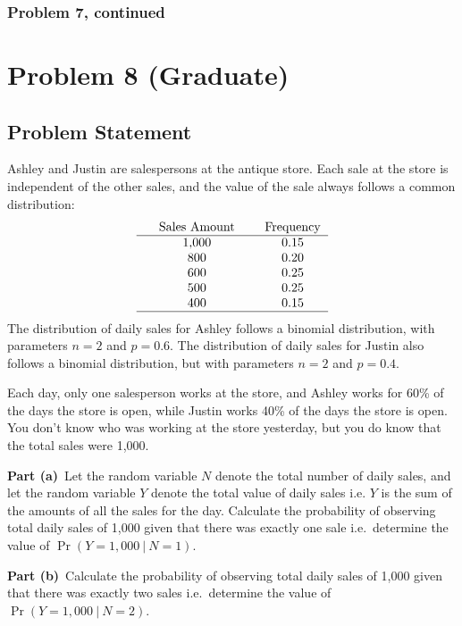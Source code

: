 \documentclass[12pt]{article}
\theoremstyle{definition}
\begin{document}
\newpage
\subsubsection*{Problem 7, continued}






\newpage
\section*{Problem 8 (Graduate)}


\subsection*{Problem Statement}

Ashley and Justin are salespersons at the antique store. Each sale at the store is independent of the other sales, and the value of the sale always follows a common distribution:
$$
\begin{tabular}{ccccc}
&  Sales Amount & & Frequency\\
\hline
& 1,000 & & 0.15\\
& 800 & & 0.20\\
& 600 & & 0.25\\
& 500 & & 0.25\\
& 400 & & 0.15\\
\hline
\end{tabular}
$$
The distribution of daily sales for Ashley follows a binomial distribution, with parameters $n = 2$ and $p = 0.6$. The distribution of daily sales for Justin also follows a binomial distribution, but with parameters $n = 2$ and $p = 0.4$.

\bigskip
Each day, only one salesperson works at the store, and Ashley works for 60\% of the days the store is open, while Justin works 40\% of the days the store is open. You don't know who was working at the store yesterday, but you do know that the total sales were 1,000. 

\bigskip
\noindent
{\bf Part (a)}\ Let the random variable $N$ denote the total number of daily sales, and let the random variable $Y$ denote the total value of daily sales i.e. $Y$ is the sum of the amounts of all the sales for the day. Calculate the probability of observing total daily sales of 1,000 given that there was exactly one sale i.e.\ determine the value of $\Pr(Y = 1,000\ |\ N = 1)$.

\bigskip
\noindent
{\bf Part (b)}\ Calculate the probability of observing total daily sales of 1,000 given that there was exactly two sales i.e.\ determine the value of $\Pr(Y = 1,000\ |\ N = 2)$.
\end{document}
